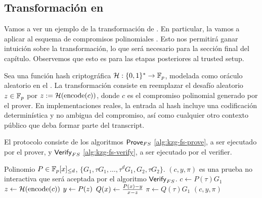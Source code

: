 \subsection{Transformación \FiatShamir en \KZG}
\label{subsec:apendice-b-fiat-shamir-transformacion-fiatshamir-en-kzg}

Vamos a ver un ejemplo de la transformación de \FiatShamir. En particular, la vamos a aplicar al esquema de compromisos polinomiales \KZG. Esto nos permitirá ganar intuición sobre la transformación, lo que será necesario para la sección final del capítulo. Observemos que esto es para las etapas posteriores al trusted setup.

Sea una función hash criptográfica $\mathcal{H}: \{0,1\}^{*} \to \mathbb{F}_p$, modelada como oráculo aleatorio en el \ROM. La transformación consiste en reemplazar el desafío aleatorio $z \in \mathbb{F}_p$ por $z := \mathcal{H}(\textnormal{encode}(c))$, donde $c$ es el compromiso polinomial generado por el prover. En implementaciones reales, la entrada al hash incluye una codificación determinística y no ambigua del compromiso, así como cualquier otro contexto público que deba formar parte del transcript.

El protocolo consiste de los algoritmos $\Prove_{FS}$ \ref{alg:kzg-fs-prove}, a ser ejecutado por el prover, y $\mathsf{Verify}_{FS}$ \ref{alg:kzg-fs-verify}, a ser ejecutado por el verifier.

\begin{algorithm}[ht]
	\caption{$\Prove_{FS}$ para el esquema \KZG}
	\label{alg:kzg-fs-prove}
	\begin{algorithmic}[1]
		\Require Polinomio $P \in \mathbb{F}_p[x]_{\leq d}$, \SRS $\{G_1, \tau G_1, \ldots, \tau^d G_1, G_2, \tau G_2\}$.
		\Ensure $(c, y, \pi)$ es una prueba no interactiva que será aceptada por el algoritmo $\mathsf{Verify}_{FS}$.
		\State $c \gets P(\tau) G_1$ 
		\State $z \gets \mathcal{H}(\textnormal{encode}(c))$ 
		\State $y \gets P(z)$ 
		\State $Q(x) \gets \frac{P(x) - y}{x - z}$ 
		\State $\pi \gets Q(\tau) G_1$ 
		\State \Return $(c, y, \pi)$
	\end{algorithmic}
\end{algorithm}

